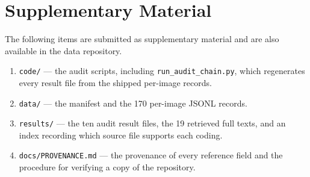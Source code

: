 \documentclass[journal,twoside,10pt]{IEEEtran}
\begin{document}


\section*{Supplementary Material}


The following items are submitted as supplementary material and are also available in the data repository.

\begin{enumerate}
\item \texttt{code/} --- the audit scripts, including \texttt{run\_audit\_chain.py}, which regenerates every result file from the shipped per-image records.
\item \texttt{data/} --- the manifest and the 170 per-image JSONL records.
\item \texttt{results/} --- the ten audit result files, the 19 retrieved full texts, and an index recording which source file supports each coding.
\item \texttt{docs/PROVENANCE.md} --- the provenance of every reference field and the procedure for verifying a copy of the repository.
\end{enumerate}
\end{document}
